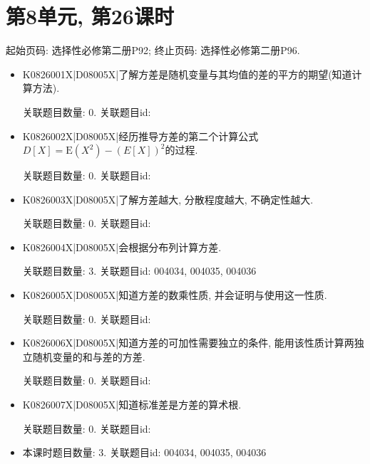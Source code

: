\section*{第8单元, 第26课时}
起始页码: 选择性必修第二册P92; 终止页码: 选择性必修第二册P96.
\begin{itemize}
\item K0826001X|D08005X|了解方差是随机变量与其均值的差的平方的期望(知道计算方法).

关联题目数量: 0. 关联题目id: 

\item K0826002X|D08005X|经历推导方差的第二个计算公式$D[X]=\mathrm{E}(X^2)-(E[X])^2$的过程.

关联题目数量: 0. 关联题目id: 

\item K0826003X|D08005X|了解方差越大, 分散程度越大, 不确定性越大.

关联题目数量: 0. 关联题目id: 

\item K0826004X|D08005X|会根据分布列计算方差.

关联题目数量: 3. 关联题目id: 004034, 004035, 004036

\item K0826005X|D08005X|知道方差的数乘性质, 并会证明与使用这一性质.

关联题目数量: 0. 关联题目id: 

\item K0826006X|D08005X|知道方差的可加性需要独立的条件, 能用该性质计算两独立随机变量的和与差的方差.

关联题目数量: 0. 关联题目id: 

\item K0826007X|D08005X|知道标准差是方差的算术根.

关联题目数量: 0. 关联题目id: 

\item 本课时题目数量: 3. 关联题目id: 004034, 004035, 004036

\end{itemize}

